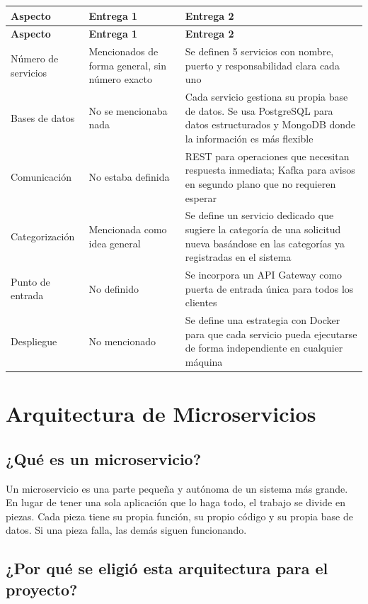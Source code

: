\documentclass[12pt, a4paper]{report}
\begin{document}
\begin{longtable}{|p{2.8cm}|p{4.2cm}|p{5.8cm}|}
\hline
\textbf{Aspecto} & \textbf{Entrega 1} & \textbf{Entrega 2} \\
\hline
\endfirsthead
\hline
\textbf{Aspecto} & \textbf{Entrega 1} & \textbf{Entrega 2} \\
\hline
\endhead
Número de servicios &
Mencionados de forma general, sin número exacto &
Se definen 5 servicios con nombre, puerto y
responsabilidad clara cada uno \\
\hline
Bases de datos &
No se mencionaba nada &
Cada servicio gestiona su propia base de datos.
Se usa PostgreSQL para datos estructurados y
MongoDB donde la información es más flexible \\
\hline
Comunicación &
No estaba definida &
REST para operaciones que necesitan respuesta
inmediata; Kafka para avisos en segundo plano
que no requieren esperar \\
\hline
Categorización &
Mencionada como idea general &
Se define un servicio dedicado que sugiere la
categoría de una solicitud nueva basándose en
las categorías ya registradas en el sistema \\
\hline
Punto de entrada &
No definido &
Se incorpora un API Gateway como puerta de
entrada única para todos los clientes \\
\hline
Despliegue &
No mencionado &
Se define una estrategia con Docker para que
cada servicio pueda ejecutarse de forma
independiente en cualquier máquina \\
\hline
\end{longtable}

\newpage

\chapter{Arquitectura de Microservicios}

\section{¿Qué es un microservicio?}

Un microservicio es una parte pequeña y autónoma de un sistema más
grande. En lugar de tener una sola aplicación que lo haga todo,
el trabajo se divide en piezas. Cada pieza tiene su propia función,
su propio código y su propia base de datos. Si una pieza falla, las
demás siguen funcionando.

\section{¿Por qué se eligió esta arquitectura para el proyecto?}
\end{document}
